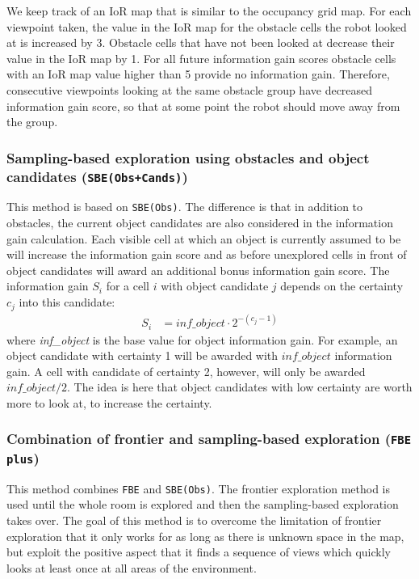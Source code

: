 \documentclass[a4paper,11pt,english]{article}
\begin{document}
We keep track of an IoR map that is similar to the occupancy grid map.
For each viewpoint taken, the value in the IoR map for the obstacle cells the robot looked at is increased by \num{3}.
Obstacle cells that have not been looked at decrease their value in the IoR map by \num{1}.
For all future information gain scores obstacle cells with an IoR map value higher than \num{5} provide no information gain.
Therefore, consecutive viewpoints looking at the same obstacle group have decreased information gain score, so that at some point the robot should move away from the group.

\subsubsection{Sampling-based exploration using obstacles and object candidates (\texttt{SBE(Obs+Cands)})}
This method is based on \texttt{SBE(Obs)}.
The difference is that in addition to obstacles, the current object candidates are also considered in the information gain calculation.
Each visible cell at which an object is currently assumed to be will increase the information gain score and as before unexplored cells in front of object candidates will award an additional bonus information gain score.
The information gain $S_i$ for a cell $i$ with object candidate $j$ depends on the certainty $c_j$ into this candidate:
\begin{align*}
 S_i &= \textit{inf\_object}\cdot 2^{-(c_j-1)}
\end{align*}
where \textit{inf\_object} is the base value for object information gain.
For example, an object candidate with certainty \num{1} will be awarded with $\textit{inf\_object}$ information gain.
A cell with candidate of certainty \num{2}, however, will only be awarded $\textit{inf\_object}/2$.
The idea is here that object candidates with low certainty are worth more to look at, to increase the certainty.

\subsubsection{Combination of frontier and sampling-based exploration (\texttt{FBE plus})}
This method combines \texttt{FBE} and \texttt{SBE(Obs)}.
The frontier exploration method is used until the whole room is explored and then the sampling-based exploration takes over. 
The goal of this method is to overcome the limitation of frontier exploration that it only works for as long as there is unknown space in the map, but exploit the positive aspect that it finds a sequence of views which quickly looks at least once at all areas of the environment.
\end{document}
